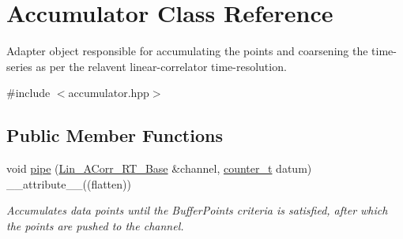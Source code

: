 \hypertarget{classAccumulator}{}\section{Accumulator Class Reference}
\label{classAccumulator}


Adapter object responsible for accumulating the points and coarsening the time-\/series as per the relavent linear-\/correlator time-\/resolution.  




{\ttfamily \#include $<$accumulator.\+hpp$>$}

\subsection*{Public Member Functions}
\begin{DoxyCompactItemize}
\item 
void \hyperlink{classAccumulator_aa1793bc1599bc2451fabc44954673164}{pipe} (\hyperlink{classLin__ACorr__RT__Base}{Lin\+\_\+\+A\+Corr\+\_\+\+R\+T\+\_\+\+Base} \&channel, \hyperlink{types_8hpp_ac89ac912f524b3e3fa3720ea55fec966}{counter\+\_\+t} datum) \+\_\+\+\_\+attribute\+\_\+\+\_\+((flatten))
\begin{DoxyCompactList}\small\item\em Accumulates data points until the Buffer\+Points criteria is satisfied, after which the points are pushed to the channel. \end{DoxyCompactList}\end{DoxyCompactItemize}
